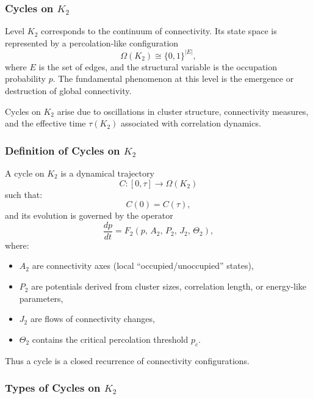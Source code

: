 
\subsubsection{Cycles on \texorpdfstring{$K_2$}{K_2}}
\label{sec:cycles-k2}

Level $K_2$ corresponds to the continuum of connectivity.
Its state space is represented by a percolation-like configuration
\[
  \Omega(K_2) \cong \{0,1\}^{|E|},
\]
where $E$ is the set of edges, and the structural variable is the
occupation probability $p$.
The fundamental phenomenon at this level is the emergence or destruction
of global connectivity.

Cycles on $K_2$ arise due to oscillations in cluster structure,
connectivity measures, and the effective time $\tau(K_2)$ associated
with correlation dynamics.

\subsubsection{Definition of Cycles on \texorpdfstring{$K_2$}{K_2}}

A cycle on $K_2$ is a dynamical trajectory
\[
  C:[0,\tau]\to\Omega(K_2)
\]
such that:
\[
  C(0)=C(\tau),
\]
and its evolution is governed by the operator
\[
  \frac{dp}{dt}
  = F_2(p,\, A_2,\, P_2,\, J_2,\, \Theta_2),
\]
where:

\begin{itemize}
  \item $A_2$ are connectivity axes (local ``occupied/unoccupied'' states),
  \item $P_2$ are potentials derived from cluster sizes, correlation length,
        or energy-like parameters,
  \item $J_2$ are flows of connectivity changes,
  \item $\Theta_2$ contains the critical percolation threshold $p_c$.
\end{itemize}

Thus a cycle is a closed recurrence of connectivity configurations.

\subsubsection{Types of Cycles on \texorpdfstring{$K_2$}{K_2}}

